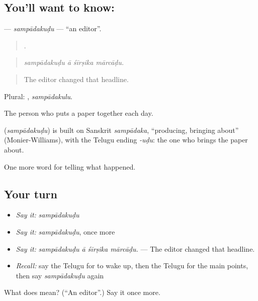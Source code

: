 \subsection*{You'll want to know: }
\textbf{} — \emph{sampādakuḍu} — \textquotedblleft{}an editor\textquotedblright{}.

\begin{quote}
   .
\end{quote}

\begin{quote}
\emph{sampādakuḍu ā śīrṣika mārcāḍu.}
\end{quote}

\begin{quote}
The editor changed that headline.
\end{quote}

Plural: , \emph{sampādakulu}.

The person who puts a paper together each day.

\begin{cousinweb}
\textbf{} (\emph{sampādakuḍu}) is built on Sanskrit \emph{sampādaka}, \textquotedblleft{}producing, bringing about\textquotedblright{} (Monier-Williams), with the Telugu ending \emph{-uḍu}: the one who brings the paper about.
\end{cousinweb}

\begin{grammarlens}[title={What you've built}]
One more word for telling what happened.
\end{grammarlens}

\subsection*{Your turn}
\begin{itemize}
\raggedright
  \item \emph{Say it:} \emph{sampādakuḍu}
  \item \emph{Say it:} \emph{sampādakuḍu}, once more
  \item \emph{Say it:} \emph{sampādakuḍu ā śīrṣika mārcāḍu.} — The editor changed that headline.
  \item \emph{Recall:} say the Telugu for to wake up, then the Telugu for the main points, then say \emph{sampādakuḍu} again
\end{itemize}

\begin{tcolorbox}[breakable,colback=teal!4,colframe=teal!35!black,title={Before you move on}]
What does  mean? (\textquotedblleft{}An editor\textquotedblright{}.) Say it once more.
\end{tcolorbox}
